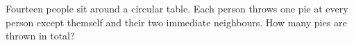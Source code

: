 Fourteen people sit around a circular table. Each person throws one pie at every person except themself and their two immediate neighbours. How many pies are thrown in total?
